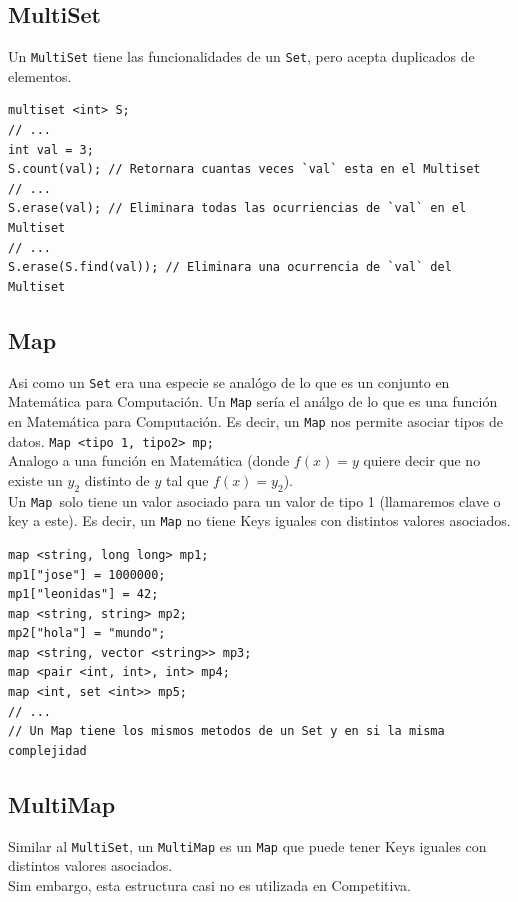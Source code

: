 \documentclass[a4paper,12pt]{article}
\begin{document}
\subsection*{MultiSet}
Un \texttt{MultiSet} tiene las funcionalidades de un \texttt{Set}, pero acepta duplicados de elementos.
\begin{lstlisting}
multiset <int> S;
// ...
int val = 3;
S.count(val); // Retornara cuantas veces `val` esta en el Multiset
// ...
S.erase(val); // Eliminara todas las ocurriencias de `val` en el Multiset
// ...
S.erase(S.find(val)); // Eliminara una ocurrencia de `val` del Multiset
\end{lstlisting}
\subsection*{Map}
Asi como un \texttt{Set} era una especie se analógo de lo que es un conjunto en Matemática para Computación. Un \texttt{Map} sería el análgo de lo que es una función en Matemática para Computación.
Es decir, un \texttt{Map} nos permite asociar tipos de datos. \texttt{Map <tipo 1, tipo2> mp;}\\
Analogo a una función en Matemática (donde $f(x) = y$ quiere decir que no existe un $y_{2}$ distinto de $y$ tal que 
$f(x) = y_{2}$).\\
Un \texttt{Map }solo tiene un valor asociado para un valor de tipo 1 (llamaremos clave o key a este). Es decir, un \texttt{Map} no tiene Keys iguales con distintos valores asociados.
\begin{lstlisting}
map <string, long long> mp1;
mp1["jose"] = 1000000;
mp1["leonidas"] = 42;
map <string, string> mp2;
mp2["hola"] = "mundo";
map <string, vector <string>> mp3;
map <pair <int, int>, int> mp4;
map <int, set <int>> mp5;
// ...
// Un Map tiene los mismos metodos de un Set y en si la misma complejidad
\end{lstlisting}
\subsection*{MultiMap}
Similar al \texttt{MultiSet}, un \texttt{MultiMap} es un \texttt{Map} que puede tener Keys iguales con distintos valores asociados.\\
Sim embargo, esta estructura casi no es utilizada en Competitiva.
\end{document}
